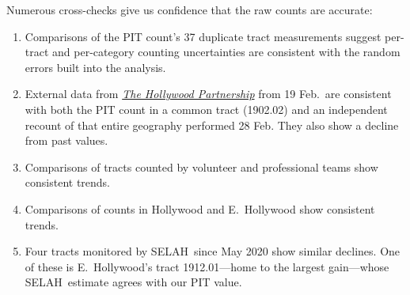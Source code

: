 \documentclass[11pt]{article}
\def\selah{SELAH}
\begin{document}
Numerous cross-checks give us confidence that the raw counts are accurate:
\begin{enumerate}
	\item Comparisons of the PIT count's 37 duplicate tract measurements suggest per-tract and per-category
		counting uncertainties are consistent with the random errors built into the analysis.
	\item External data from \href{https://hollywoodpartnership.com/}{\it The Hollywood Partnership} 
		from 19 Feb.\ are consistent with both the PIT count in a common tract (1902.02) and an independent 
		recount of that entire geography performed 28 Feb. They also show a decline from past values.
	\item Comparisons of tracts counted by volunteer and professional teams show consistent trends.
	\item Comparisons of counts in Hollywood and E.~Hollywood show consistent trends.%
	\item Four tracts monitored by \selah\ since May 2020 show similar declines. One of these is E.~Hollywood's tract 
		1912.01---home to the largest gain---whose \selah\ estimate agrees with our PIT value.%
\end{enumerate}

%
%
%
\end{document}

